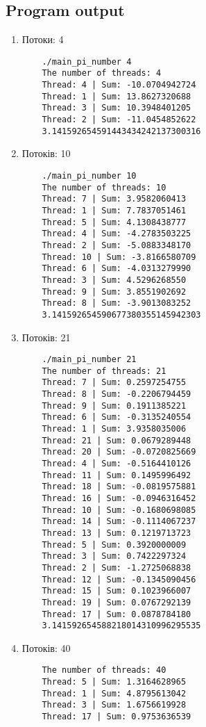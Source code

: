 \documentclass{article}
\begin{document}
\subsection{Program output}
\begin{enumerate}
	\normalsize
	\item Потоки: 4\vspace{-3mm}
	\begin{verbatim}
	./main_pi_number 4
	The number of threads: 4
	Thread: 4 | Sum: -10.0704942724
	Thread: 1 | Sum: 13.8627320688
	Thread: 3 | Sum: 10.3948401205
	Thread: 2 | Sum: -11.0454852622
	3.141592654591443434242137300316
	\end{verbatim}
	\item Потоків: 10\vspace{-3mm}
	\begin{verbatim}
	./main_pi_number 10
	The number of threads: 10
	Thread: 7 | Sum: 3.9582060413
	Thread: 1 | Sum: 7.7837051461
	Thread: 5 | Sum: 4.1308438777
	Thread: 4 | Sum: -4.2783503225
	Thread: 2 | Sum: -5.0883348170
	Thread: 10 | Sum: -3.8166580709
	Thread: 6 | Sum: -4.0313279990
	Thread: 3 | Sum: 4.5296268550
	Thread: 9 | Sum: 3.8551902692
	Thread: 8 | Sum: -3.9013083252
	3.141592654590677380355145942303
	\end{verbatim}
	\item Потоків: 21 \vspace{-3mm}
	\begin{verbatim}
	./main_pi_number 21
	The number of threads: 21
	Thread: 7 | Sum: 0.2597254755
	Thread: 8 | Sum: -0.2206794459
	Thread: 9 | Sum: 0.1911385221
	Thread: 6 | Sum: -0.3135240554
	Thread: 1 | Sum: 3.9358035006
	Thread: 21 | Sum: 0.0679289448
	Thread: 20 | Sum: -0.0720825669
	Thread: 4 | Sum: -0.5164410126
	Thread: 11 | Sum: 0.1495996492
	Thread: 18 | Sum: -0.0819575881
	Thread: 16 | Sum: -0.0946316452
	Thread: 10 | Sum: -0.1680698085
	Thread: 14 | Sum: -0.1114067237
	Thread: 13 | Sum: 0.1219713723
	Thread: 5 | Sum: 0.3920000009
	Thread: 3 | Sum: 0.7422297324
	Thread: 2 | Sum: -1.2725068838
	Thread: 12 | Sum: -0.1345090456
	Thread: 15 | Sum: 0.1023966007
	Thread: 19 | Sum: 0.0767292139
	Thread: 17 | Sum: 0.0878784180
	3.141592654588218014310996295535
	\end{verbatim}
	\item Потоків: 40\vspace{-3mm}
	\begin{verbatim}
	The number of threads: 40
	Thread: 5 | Sum: 1.3164628965
	Thread: 1 | Sum: 4.8795613042
	Thread: 3 | Sum: 1.6756619928
	Thread: 17 | Sum: 0.9753636539

\end{verbatim}
\end{enumerate}
\end{document}
